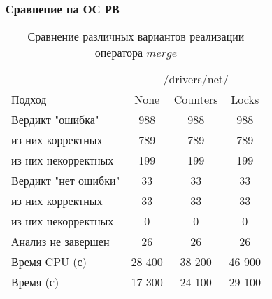 \subsubsection{Сравнение на ОС РВ}

\begin{center}
  \begin{table}[h]\footnotesize
  	\label{table-drivers-lock-merge}
    \caption{Сравнение различных вариантов реализации оператора $merge$}
    \begin{tabular}{ | l | c | c | c | }
      \hline
      		& 		 \multicolumn{3}{|c|}{/drivers/net/} \\
      Подход         				& None 	& Counters 	& Locks  \\ \hline
      Вердикт "ошибка" 				& 988   & 988       & 988       \\ 
  \hspace{0.5cm} из них корректных 	& 789 	& 789 		& 789     \\ 
  \hspace{0.5cm} из них некорректных & 199 	& 199 		& 199       \\ \hline
      Вердикт "нет ошибки"  		& 33    & 33        & 33      \\ 
  \hspace{0.5cm} из них корректных 	& 33 	& 33    	& 33      \\
  \hspace{0.5cm} из них некорректных & 0 	& 0    		& 0     \\ \hline
      Анализ не завершен       		& 26    & 26        & 26    \\ \hline
      Время CPU (с)   				& 28 400 & 38 200   & 46 900    \\ 
      Время (с)  					& 17 300 & 24 100   & 29 100      \\
      \hline
    \end{tabular}
  \end{table}
\end{center}


